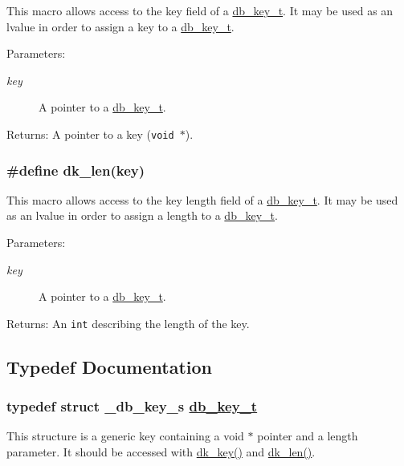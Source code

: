 This macro allows access to the key field of a \hyperlink{group__dbprim_a0}{db\_\-key\_\-t}. It may be used as an lvalue in order to assign a key to a \hyperlink{group__dbprim_a0}{db\_\-key\_\-t}.

\begin{Desc}
\item[Parameters:]
\begin{description}
\item[{\em key}]A pointer to a \hyperlink{group__dbprim_a0}{db\_\-key\_\-t}. \end{description}
\end{Desc}
\begin{Desc}
\item[Returns:]A pointer to a key ({\tt void $\ast$}). \end{Desc}
\hypertarget{group__dbprim_a3}{
\subsubsection[dk\_\-len]{\setlength{\rightskip}{0pt plus 5cm}\#define dk\_\-len(key)}}
\label{group__dbprim_a3}


This macro allows access to the key length field of a \hyperlink{group__dbprim_a0}{db\_\-key\_\-t}. It may be used as an lvalue in order to assign a length to a \hyperlink{group__dbprim_a0}{db\_\-key\_\-t}.

\begin{Desc}
\item[Parameters:]
\begin{description}
\item[{\em key}]A pointer to a \hyperlink{group__dbprim_a0}{db\_\-key\_\-t}. \end{description}
\end{Desc}
\begin{Desc}
\item[Returns:]An {\tt int} describing the length of the key. \end{Desc}


\subsection{Typedef Documentation}
\hypertarget{group__dbprim_a0}{
\subsubsection[db\_\-key\_\-t]{\setlength{\rightskip}{0pt plus 5cm}typedef struct \_\-db\_\-key\_\-s \hyperlink{dbprim_8h_a0}{db\_\-key\_\-t}}}
\label{group__dbprim_a0}


This structure is a generic key containing a void $\ast$ pointer and a length parameter. It should be accessed with \hyperlink{group__dbprim_a2}{dk\_\-key()} and \hyperlink{group__dbprim_a3}{dk\_\-len()}. 